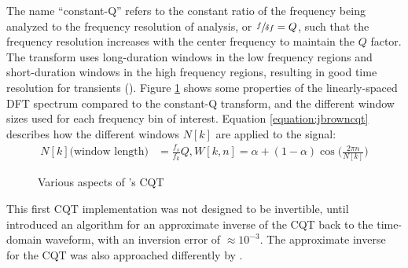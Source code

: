 \documentclass[report.tex]{subfiles}
\begin{document}
The name ``constant-Q'' refers to the constant ratio of the frequency being analyzed to the frequency resolution of analysis, or $\sfrac{f}{\delta f} = Q$, such that the frequency resolution increases with the center frequency to maintain the $Q$ factor. The transform uses long-duration windows in the low frequency regions and short-duration windows in the high frequency regions, resulting in good time resolution for transients (\cite{cqtransient}). Figure \ref{fig:jbrowncqt} shows some properties of the linearly-spaced DFT spectrum compared to the constant-Q transform, and the different window sizes used for each frequency bin of interest. Equation \ref{equation:jbrowncqt} describes how the different windows $N[k]$ are applied to the signal:
\begin{align}\tag{9}\label{equation:jbrowncqt}
	\nonumber N[k] \text{(window length)} &= \frac{f_{s}}{f_{k}}Q, W[k, n] = \alpha + (1 - \alpha)\cos\big(\frac{2\pi n}{N[k]}\big)
\end{align}

\begin{figure}[ht]
	\centering
	\hspace{0.5em}
	\caption{Various aspects of \textcite{jbrown}'s CQT}
	\label{fig:jbrowncqt}
\end{figure}

This first CQT implementation was not designed to be invertible, until \textcite{klapuricqt} introduced an algorithm for an approximate inverse of the CQT back to the time-domain waveform, with an inversion error of $\approx 10^{-3}$. The approximate inverse for the CQT was also approached differently by \textcite{fitzgeraldcqt}.
\end{document}
